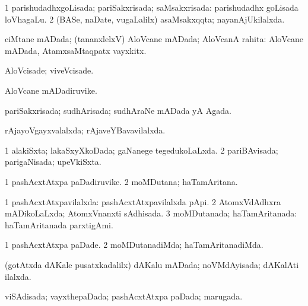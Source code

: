 \bentry
{} 
\gl{\gu}
\expl{}
\bmng
\bnum
\num{1} parishudadhxgoLisada; pariSakxrisada; saMsakxrisada:  parishudadhx goLisada loVhagaLu. 
\num{2} (BASe, naDate, \mo vugaLalilx) asaMsakxqqta; nayanAjUkilalxda. 
\enum
\emng
\eentry

\bentry
{} 
\gl{\gu}
\expl{}
\bmng
ciMtane mADada; (tananxlelxV) AloVcane mADada; AloVcanA rahita:  AloVcane mADada, AtamxsaMtaqpatx vayxkitx. 
\emng
\eentry

\bentry
{} 
\gl{\kirxvi}
\expl{}
\bmng
AloVcisade; viveVcisade. 
\emng
\eentry

\bentry
{} 
\gl{\nA}
\expl{}
\bmng
AloVcane mADadiruvike. 
\emng
\eentry

\bentry
{} 
\gl{\gu}
\expl{}
\bmng
pariSakxrisada; sudhArisada; sudhAraNe mADada yA Agada. 
\emng
\eentry

\bentry
{} 
\gl{\gu}
\expl{}
\bmng
rAjayoVgayxvalalxda; rAjaveYBavavilalxda. 
\emng
\eentry

\bentry
{} 
\gl{\gu}
\expl{}
\bmng
\bnum
\num{1} alakiSxta; lakaSxyXkoDada; gaNanege tegedukoLaLxda. 
\num{2} pariBAvisada; parigaNisada; upeVkiSxta. 
\enum
\emng
\eentry

\bentry
{} 
\gl{\nA}
\expl{}
\bmng
\bnum
\num{1} pashAcxtAtxpa paDadiruvike. 
\num{2} moMDutana; haTamAritana. 
\enum
\emng
\eentry

\bentry
{} 
\gl{\gu}
\expl{}
\bmng
\bnum
\num{1} pashAcxtAtxpavilalxda:  pashAcxtAtxpavilalxda pApi. 
\num{2} AtomxVdAdhxra mADikoLaLxda; AtomxVnanxti sAdhisada. 
\num{3} moMDutanada; haTamAritanada:  haTamAritanada parxtigAmi. 
\enum
\emng
\eentry

\bentry
{} 
\gl{\kirxvi}
\expl{}
\bmng
\bnum
\num{1} pashAcxtAtxpa paDade. 
\num{2} moMDutanadiMda; haTamAritanadiMda. 
\enum
\emng
\eentry

\bentry
{} 
\gl{\gu}
\expl{}
\bmng
(gotAtxda dAKale pusatxkadalilx) dAKalu mADada; noVMdAyisada; dAKalAti ilalxda. 
\emng
\eentry

\bentry
{} 
\gl{\gu}
\expl{}
\bmng
viSAdisada; vayxthepaDada; pashAcxtAtxpa paDada; marugada. 
\emng
\eentry

